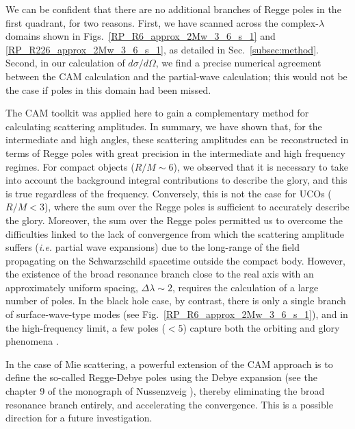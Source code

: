 \documentclass[aps,prd,longbibliography,reprint,twocolumn,amsmath,amssymb,amsfonts,showpacs,footnote,superscriptaddress]{revtex4-1}%
\begin{document}
We can be confident that there are no additional branches of Regge poles in the first quadrant, for two reasons. First, we have scanned across the complex-$\lambda$ domains shown in Figs.~\ref{RP_R6_approx_2Mw_3_6_s_1} and \ref{RP_R226_approx_2Mw_3_6_s_1}, as detailed in Sec.~\ref{subsec:method}. Second, in our calculation of $d\sigma/d\Omega$, we find a precise numerical agreement between the CAM calculation and the partial-wave calculation; this would not be the case if poles in this domain had been missed.

The CAM toolkit was applied here to gain a complementary method for calculating scattering amplitudes. In summary, we have shown that, for the intermediate and high angles, these scattering amplitudes can be reconstructed in terms of Regge poles with great precision in the intermediate and high frequency regimes. For compact objects ($R/M\sim6$), we observed that it is necessary to take into account the background integral contributions to describe the glory, and this is true regardless of the frequency. Conversely, this is not the case for UCOs ($R/M < 3$), where the sum over the Regge poles is sufficient to accurately describe the glory. Moreover, the sum over the Regge poles permitted us to overcome the difficulties linked to the lack of convergence from which the scattering amplitude suffers (\textit{i.e.} partial wave expansions) due to the long-range of the field propagating on the Schwarzschild spacetime outside the compact body. However, the existence of the broad resonance branch %
close to the real axis with an approximately uniform spacing, $\Delta\lambda\sim 2$, requires the calculation of a large number of poles. In the black hole case, by contrast, there is only a single branch of surface-wave-type modes (see Fig.~\ref{RP_R6_approx_2Mw_3_6_s_1}), and in the high-frequency limit, a few poles ($<5$) capture both the orbiting and glory phenomena \cite{Folacci:2019cmc, Folacci:2019vtt}.

In the case of Mie scattering, a powerful extension of the CAM approach is to define the so-called Regge-Debye poles using the Debye expansion (see the chapter 9 of the monograph of Nussenzveig \cite{Nussenzveig:2006}), thereby eliminating the broad resonance branch entirely, and accelerating the convergence. This is a possible direction for a future investigation.

\end{document}
